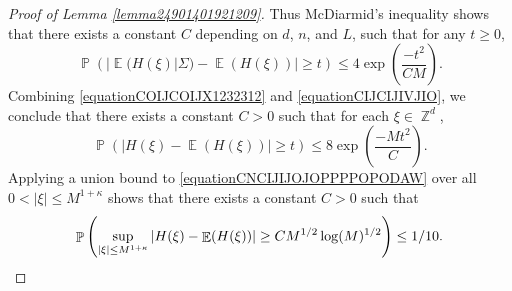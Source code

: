 \documentclass[dvipsnames,letterpaper,12pt]{article}
\numberwithin{equation}{section}
\DeclareMathOperator{\ZZ}{\mathbb{Z}}
\numberwithin{theorem}{section}
\DeclareMathOperator{\EE}{\mathbb{E}}
\DeclareMathOperator{\PP}{\mathbb{P}}
\begin{document}
\begin{proof}[Proof of Lemma \ref{lemma24901401921209}]
    Thus McDiarmid's inequality shows that there exists a constant $C$ depending on $d$, $n$, and $L$, such that for any $t \geq 0$,
    \begin{equation} \label{equationCIJCIJIVJIO}
        \PP \left( |\EE(H(\xi)|\Sigma) - \EE(H(\xi))| \geq t \right) \leq 4 \exp \left( \frac{-t^2}{C M} \right).
    \end{equation}
    Combining \eqref{equationCOIJCOIJX1232312} and \eqref{equationCIJCIJIVJIO}, we conclude that there exists a constant $C > 0$ such that for each $\xi \in \ZZ^d$,
    \begin{equation} \label{equationCNCIJIJOJOPPPPOPODAW}
        \PP \left( | H(\xi) - \EE(H(\xi)) | \geq t  \right) \leq 8 \exp \left( \frac{-M t^2}{C} \right).
    \end{equation}
    Applying a union bound to \eqref{equationCNCIJIJOJOPPPPOPODAW} over all $0 < |\xi| \leq M^{1 + \kappa}$ shows that there exists a constant $C > 0$ such that
    \[ \PP \left( \sup_{|\xi| \leq M^{1 + \kappa}} | H(\xi) - \EE(H(\xi)) | \geq C M^{1/2} \log(M)^{1/2} \right) \leq 1/10. \qedhere \]
\end{proof}
\end{document}

